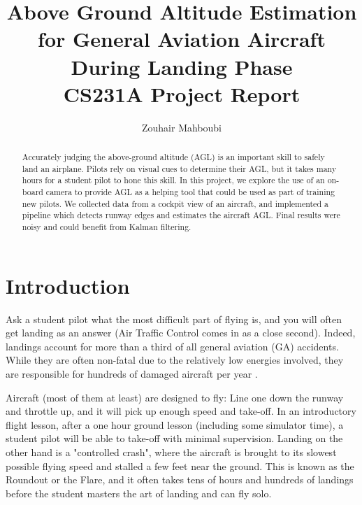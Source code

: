 \documentclass[letterpaper, conference]{IEEEtran}  %
\title{Above Ground Altitude Estimation for General Aviation Aircraft During Landing Phase\\
\vspace{1cm}
\small{CS231A Project Report}}
\author{Zouhair Mahboubi}
\begin{document}
 
\maketitle 


%






\begin{abstract}
Accurately judging the above-ground altitude (AGL) is an important skill to safely land an airplane. Pilots rely on visual cues to determine their AGL, but it takes many hours for a student pilot to hone this skill. In this project, we explore the use of an on-board camera to provide AGL as a helping tool that could be used as part of training new pilots. We collected data from a cockpit view of an aircraft, and implemented a pipeline which detects runway edges and estimates the aircraft AGL. Final results were noisy and could benefit from Kalman filtering.
\end{abstract}

\section{Introduction}
Ask a student pilot what the most difficult part of flying is, and you will often get landing as an answer (Air Traffic Control comes in as a close second). Indeed, landings account for more than a third of all general aviation (GA) accidents. While they are often non-fatal due to the relatively low energies involved, they are responsible for hundreds of damaged aircraft per year \cite{Aviat2012}.

Aircraft (most of them at least) are designed to fly: Line one down the runway and throttle up, and it will pick up enough speed and take-off. In an introductory flight lesson, after a one hour ground lesson (including some simulator time), a student pilot will be able to take-off with minimal supervision. Landing on the other hand is a "controlled crash", where the aircraft is brought to its slowest possible flying speed and stalled a few feet near the ground. This is known as the Roundout or the Flare, and it often takes tens of hours and hundreds of landings before the student masters the art of landing and can fly solo.
\end{document}
